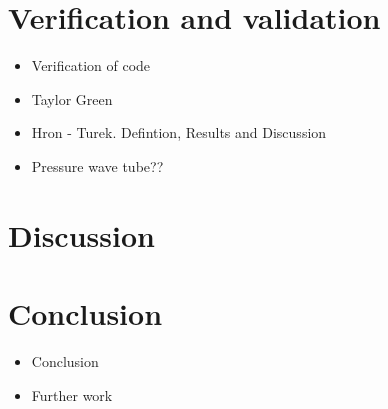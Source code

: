 \section*{Verification and validation}
\begin{itemize}
\item Verification of code
\item Taylor Green
\item Hron - Turek. Defintion, Results and Discussion 
\item Pressure wave tube??
\end{itemize}

\section*{Discussion}

\section*{Conclusion}
\begin{itemize}
\item Conclusion
\item Further work 
\end{itemize}


